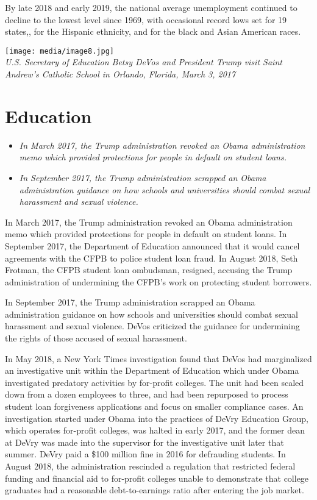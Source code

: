 By late 2018 and early 2019, the national average unemployment continued
to decline to the lowest level since 1969, with occasional record lows
set for 19 states,, for the Hispanic ethnicity, and for the black and
Asian American races.

\texttt{[image: media/image8.jpg]}\\
\emph{U.S. Secretary of Education Betsy DeVos and President Trump visit
Saint Andrew's Catholic School in Orlando, Florida, March 3, 2017}

\section{Education}\label{education}

\begin{itemize}
\item
  \emph{In March 2017, the Trump administration revoked an Obama
  administration memo which provided protections for people in default
  on student loans.}
\item
  \emph{In September 2017, the Trump administration scrapped an Obama
  administration guidance on how schools and universities should combat
  sexual harassment and sexual violence.}
\end{itemize}

In March 2017, the Trump administration revoked an Obama administration
memo which provided protections for people in default on student loans.
In September 2017, the Department of Education announced that it would
cancel agreements with the CFPB to police student loan fraud. In August
2018, Seth Frotman, the CFPB student loan ombudsman, resigned, accusing
the Trump administration of undermining the CFPB's work on protecting
student borrowers.

In September 2017, the Trump administration scrapped an Obama
administration guidance on how schools and universities should combat
sexual harassment and sexual violence. DeVos criticized the guidance for
undermining the rights of those accused of sexual harassment.

In May 2018, a New York Times investigation found that DeVos had
marginalized an investigative unit within the Department of Education
which under Obama investigated predatory activities by for-profit
colleges. The unit had been scaled down from a dozen employees to three,
and had been repurposed to process student loan forgiveness applications
and focus on smaller compliance cases. An investigation started under
Obama into the practices of DeVry Education Group, which operates
for-profit colleges, was halted in early 2017, and the former dean at
DeVry was made into the supervisor for the investigative unit later that
summer. DeVry paid a \$100 million fine in 2016 for defrauding students.
In August 2018, the administration rescinded a regulation that
restricted federal funding and financial aid to for-profit colleges
unable to demonstrate that college graduates had a reasonable
debt-to-earnings ratio after entering the job market.

